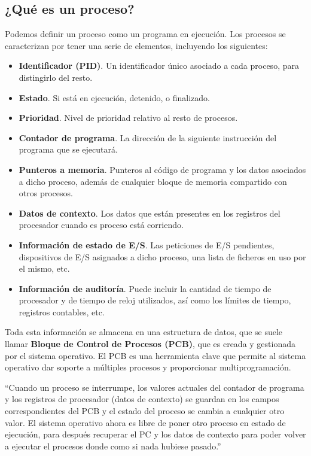 \documentclass[12pt]{article}
\begin{document}
  \subsection{¿Qué es un proceso?}
  Podemos definir un proceso como un programa en ejecución. Los procesos se caracterizan por tener una serie de elementos, incluyendo los siguientes:
  \begin{itemize}
    \item \textbf{Identificador (PID)}. Un identificador único asociado a cada proceso, para distingirlo del resto.

    \item \textbf{Estado}. Si está en ejecución, detenido, o finalizado.

    \item \textbf{Prioridad}. Nivel de prioridad relativo al resto de procesos.

    \item \textbf{Contador de programa}. La dirección de la siguiente instrucción del programa que se ejecutará.

    \item \textbf{Punteros a memoria}. Punteros al código de programa y los datos asociados a dicho proceso, además de cualquier bloque de memoria compartido con otros procesos.

    \item \textbf{Datos de contexto}. Los datos que están presentes en los registros del procesador cuando es proceso está corriendo.

    \item \textbf{Información de estado de E/S}. Las peticiones de E/S pendientes, dispositivos de E/S asignados a dicho proceso, una lista de ficheros en uso por el mismo, etc.

    \item \textbf{Información de auditoría}. Puede incluir la cantidad de tiempo de procesador y de tiempo de reloj utilizados, así como los límites de tiempo, registros contables, etc.
  \end{itemize}

  Toda esta información se almacena en una estructura de datos, que se suele llamar \textbf{Bloque de Control de Procesos (PCB)}, que es creada y gestionada por el sistema operativo. El PCB es una herramienta clave que permite al sistema operativo dar soporte a múltiples procesos y proporcionar multiprogramación.

  ``Cuando un proceso se interrumpe, los valores actuales del contador de programa y los registros de procesador (datos de contexto) se guardan en los campos correspondientes del PCB y el estado del proceso se cambia a cualquier otro valor. El sistema operativo ahora es libre de poner otro proceso en estado de ejecución, para después recuperar el PC y los datos de contexto para poder volver a ejecutar el procesos donde como si nada hubiese pasado.''
\end{document}
